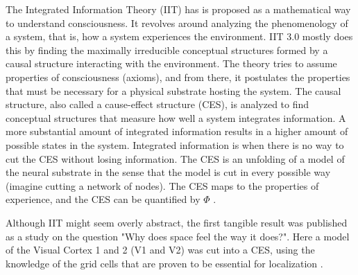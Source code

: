The Integrated Information Theory (IIT) has is proposed as a mathematical way to understand consciousness.
It revolves around analyzing the phenomenology of a system, that is, how a system experiences the environment.
IIT 3.0 mostly does this by finding the maximally irreducible conceptual structures formed by a causal structure interacting with the environment.
The theory tries to assume properties of consciousness (axioms), and from there, it postulates the properties that must be necessary for a physical substrate hosting the system.
The causal structure, also called a cause-effect structure (CES), is analyzed to find conceptual structures that measure how well a system integrates information.
A more substantial amount of integrated information results in a higher amount of possible states in the system.
Integrated information is when there is no way to cut the CES without losing information.
The CES is an unfolding of a model of the neural substrate in the sense that the model is cut in every possible way (imagine cutting a network of nodes).
The CES maps to the properties of experience, and the CES can be quantified by $\Phi$ \cite{oizumi_phenomenology_2014}.

Although IIT might seem overly abstract, the first tangible result was published as a study on the question "Why does space feel the way it does?".
Here a model of the Visual Cortex 1 and 2 (V1 and V2) was cut into a CES, using the knowledge of the grid cells that are proven to be essential for localization \cite{haun_why_2019}.

